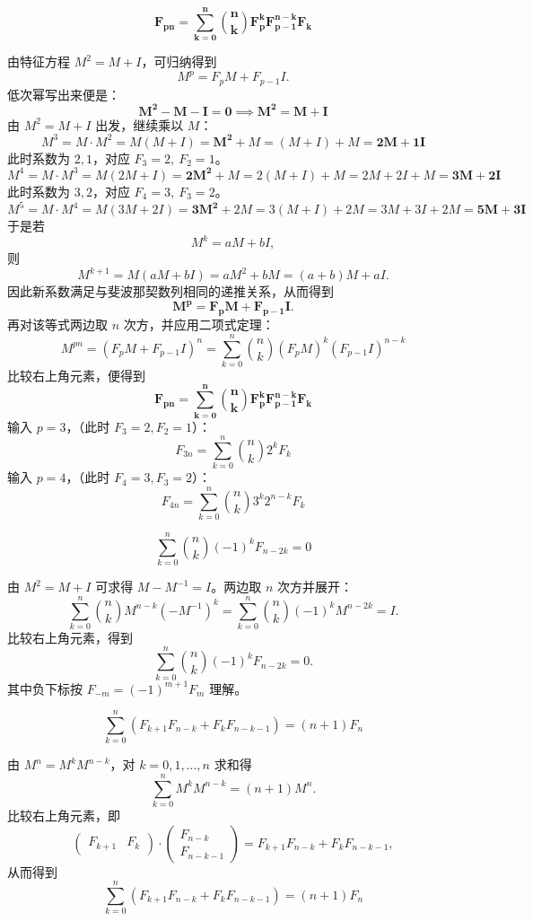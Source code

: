 \begin{conclusion}[求$F_{pn}$]
   \[ \mathbf{F_{pn} = \sum_{k=0}^n \binom{n}{k} F_p^k F_{p-1}^{n-k} F_k} \]
\end{conclusion}
由特征方程 \(M^2=M+I\)，可归纳得到
\[
M^p = F_p M + F_{p-1} I.
\]
低次幂写出来便是：
$$ \mathbf{M^2 - M - I = 0 \implies M^2 = M + I} $$
由 \(M^2=M+I\) 出发，继续乘以 \(M\)：
\[M^3 = M \cdot M^2= M(M + I) = \mathbf{M^2} + M= (M + I) + M = \mathbf{2M + 1I}\]
此时系数为 \(2,1\)，对应 \(F_3=2,\ F_2=1\)。
\[M^4 = M \cdot M^3 = M(2M + I) = \mathbf{2M^2} + M= 2(M + I) + M = 2M + 2I + M = \mathbf{3M + 2I}\]
此时系数为 \(3,2\)，对应 \(F_4=3,\ F_3=2\)。
\[M^5 = M \cdot M^4 = M(3M + 2I) = \mathbf{3M^2} + 2M= 3(M + I) + 2M = 3M + 3I + 2M = \mathbf{5M + 3I}\]
于是若
\[
M^k = aM+bI,
\]
则
\[
M^{k+1}=M(aM+bI)=aM^2+bM=(a+b)M+aI.
\]
因此新系数满足与斐波那契数列相同的递推关系，从而得到
\[
\mathbf{M^p = F_p M + F_{p-1} I}.
\]
再对该等式两边取 $n$ 次方，并应用二项式定理：
$$ M^{pn} = (F_p M + F_{p-1} I)^n = \sum_{k=0}^n \binom{n}{k} (F_p M)^k (F_{p-1} I)^{n-k} $$
比较右上角元素，便得到
$$ \mathbf{F_{pn} = \sum_{k=0}^n \binom{n}{k} F_p^k F_{p-1}^{n-k} F_k} $$
输入 $p=3$，（此时 $F_3=2, F_2=1$）：\[\boxed{ F_{3n} = \sum_{k=0}^n \binom{n}{k} 2^k F_k }\]
输入 $p=4$，（此时 $F_4=3, F_3=2$）：\[ \boxed{ F_{4n} = \sum_{k=0}^n \binom{n}{k} 3^k 2^{n-k} F_k }\]

\begin{conclusion}[含$(-1)^n$]
 \[ \sum_{k=0}^n \binom{n}{k} (-1)^k F_{n-2k} = 0 \]
\end{conclusion}
由 \(M^2=M+I\) 可求得 \(M-M^{-1}=I\)。两边取 \(n\) 次方并展开：
\[
\sum_{k=0}^n \binom{n}{k} M^{n-k} (-M^{-1})^k
= \sum_{k=0}^n \binom{n}{k} (-1)^k M^{n-2k}
= I.
\]
比较右上角元素，得到
\[
\boxed{ \sum_{k=0}^n \binom{n}{k} (-1)^k F_{n-2k} = 0 } .
\]
其中负下标按 \(F_{-m} = (-1)^{m+1}F_m\) 理解。

\begin{conclusion}[双项乘积求和]
 \[ \sum_{k=0}^n (F_{k+1}F_{n-k} + F_k F_{n-k-1}) = (n+1)F_n \]
\end{conclusion}
由 \(M^n=M^kM^{n-k}\)，对 \(k=0,1,\dots,n\) 求和得
\[
\sum_{k=0}^n M^kM^{n-k}=(n+1)M^n.
\]
比较右上角元素，即
\[
\begin{pmatrix} F_{k+1} & F_k \end{pmatrix} \cdot \begin{pmatrix} F_{n-k} \\ F_{n-k-1} \end{pmatrix}
= F_{k+1}F_{n-k} + F_k F_{n-k-1},
\]
从而得到
\[ \sum_{k=0}^n (F_{k+1}F_{n-k} + F_k F_{n-k-1}) = (n+1)F_n \]



